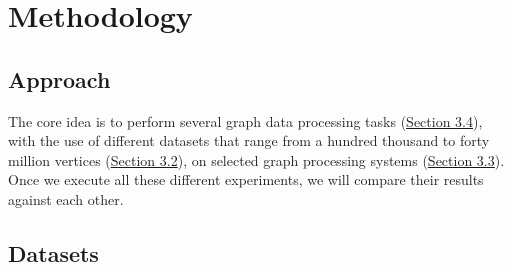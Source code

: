 \documentclass[a4paper,11pt]{article}
\begin{document}








\section{Methodology} \label{methodology}

\subsection{Approach} \label{approach}

\par The core idea is to perform several graph data processing tasks (\hyperref[algos]{Section 3.4}), with the use of different datasets that range from a hundred thousand to forty million vertices (\hyperref[datasets]{Section 3.2}), on selected graph processing systems (\hyperref[graph-proc]{Section 3.3}). Once we execute all these different experiments, we will compare their results against each other.

\subsection{Datasets} \label{datasets}
\end{document}
